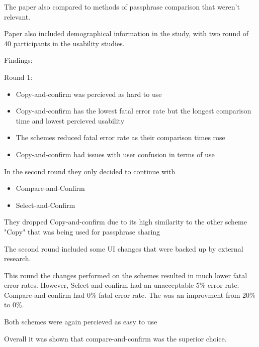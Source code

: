 The paper also compared to methods of passphrase comparison that weren't relevant.

Paper also included demographical information in the study, with two round of 40 participants in the usability studies.


Findings:

Round 1:
\begin{itemize}
    \item Copy-and-confirm was percieved as hard to use
    \item Copy-and-confirm has the lowest fatal error rate but the longest comparison time and lowest percieved usability
    \item The schemes reduced fatal error rate as their comparison times rose
    \item Copy-and-confirm had issues with user confusion in terms of use
\end{itemize}

In the second round they only decided to continue with

\begin{itemize}
    \item Compare-and-Confirm
    \item Select-and-Confirm
\end{itemize}

They dropped Copy-and-confirm due to its high similarity to the other scheme "Copy" that was being used for passphrase sharing

The second round included some UI changes that were backed up by external research.

This round the changes performed on the schemes resulted in much lower fatal error rates. However, Select-and-confirm had an unacceptable 5\% error rate. Compare-and-confirm had 0\% fatal error rate. The was an improvment from 20\% to 0\%.

Both schemes were again percieved as easy to use

Overall it was shown that compare-and-confirm was the superior choice.